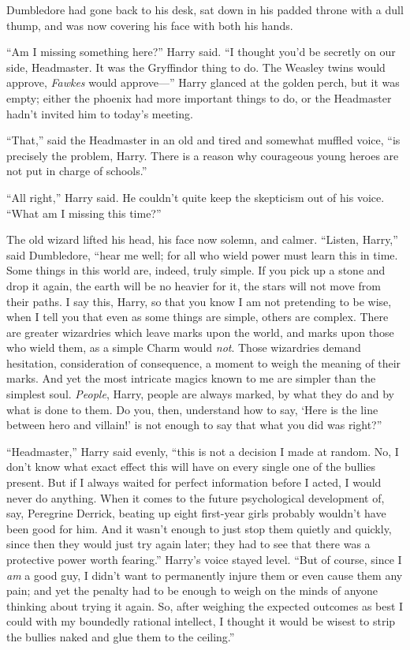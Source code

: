Dumbledore had gone back to his desk, sat down in his padded throne with a dull thump, and was now covering his face with both his hands.

“Am I missing something here?” Harry said. “I thought you’d be secretly on our side, Headmaster. It was the Gryffindor thing to do. The Weasley twins would approve, \emph{Fawkes} would approve—” Harry glanced at the golden perch, but it was empty; either the phoenix had more important things to do, or the Headmaster hadn’t invited him to today’s meeting.

“That,” said the Headmaster in an old and tired and somewhat muffled voice, “is precisely the problem, Harry. There is a reason why courageous young heroes are not put in charge of schools.”

“All right,” Harry said. He couldn’t quite keep the skepticism out of his voice. “What am I missing this time?”

The old wizard lifted his head, his face now solemn, and calmer. “Listen, Harry,” said Dumbledore, “hear me well; for all who wield power must learn this in time. Some things in this world are, indeed, truly simple. If you pick up a stone and drop it again, the earth will be no heavier for it, the stars will not move from their paths. I say this, Harry, so that you know I am not pretending to be wise, when I tell you that even as some things are simple, others are complex. There are greater wizardries which leave marks upon the world, and marks upon those who wield them, as a simple Charm would \emph{not}. Those wizardries demand hesitation, consideration of consequence, a moment to weigh the meaning of their marks. And yet the most intricate magics known to me are simpler than the simplest soul. \emph{People}, Harry, people are always marked, by what they do and by what is done to them. Do you, then, understand how to say, ‘Here is the line between hero and villain!’ is not enough to say that what you did was right?”

“Headmaster,” Harry said evenly, “this is not a decision I made at random. No, I don’t know what exact effect this will have on every single one of the bullies present. But if I always waited for perfect information before I acted, I would never do anything. When it comes to the future psychological development of, say, Peregrine Derrick, beating up eight first-year girls probably wouldn’t have been good for him. And it wasn’t enough to just stop them quietly and quickly, since then they would just try again later; they had to see that there was a protective power worth fearing.” Harry’s voice stayed level. “But of course, since I \emph{am} a good guy, I didn’t want to permanently injure them or even cause them any pain; and yet the penalty had to be enough to weigh on the minds of anyone thinking about trying it again. So, after weighing the expected outcomes as best I could with my boundedly rational intellect, I thought it would be wisest to strip the bullies naked and glue them to the ceiling.”

